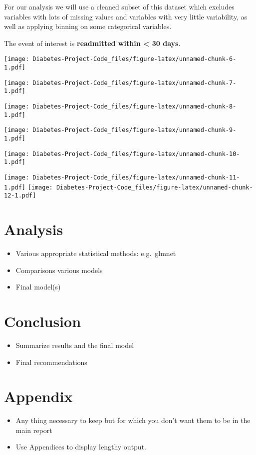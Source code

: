 \documentclass[
]{article}
\providecommand{\tightlist}{%
  \setlength{\itemsep}{0pt}\setlength{\parskip}{0pt}}
\begin{document}
For our analysis we will use a cleaned subset of this dataset which
excludes variables with lots of missing values and variables with very
little variability, as well as applying binning on some categorical
variables.

The event of interest is \textbf{readmitted within \textless{} 30 days}.

\texttt{[image: Diabetes-Project-Code\_files/figure-latex/unnamed-chunk-6-1.pdf]}

\texttt{[image: Diabetes-Project-Code\_files/figure-latex/unnamed-chunk-7-1.pdf]}

\texttt{[image: Diabetes-Project-Code\_files/figure-latex/unnamed-chunk-8-1.pdf]}

\texttt{[image: Diabetes-Project-Code\_files/figure-latex/unnamed-chunk-9-1.pdf]}

\texttt{[image: Diabetes-Project-Code\_files/figure-latex/unnamed-chunk-10-1.pdf]}

\texttt{[image: Diabetes-Project-Code\_files/figure-latex/unnamed-chunk-11-1.pdf]}
\texttt{[image: Diabetes-Project-Code\_files/figure-latex/unnamed-chunk-12-1.pdf]}

\hypertarget{analysis}{%
\section{Analysis}\label{analysis}}

\begin{itemize}
\tightlist
\item
  Various appropriate statistical methods: e.g.~glmnet
\item
  Comparisons various models
\item
  Final model(s)
\end{itemize}

\hypertarget{conclusion}{%
\section{Conclusion}\label{conclusion}}

\begin{itemize}
\tightlist
\item
  Summarize results and the final model
\item
  Final recommendations
\end{itemize}

\hypertarget{appendix}{%
\section{Appendix}\label{appendix}}

\begin{itemize}
\tightlist
\item
  Any thing necessary to keep but for which you don't want them to be in
  the main report
\item
  Use Appendices to display lengthy output.
\end{itemize}
\end{document}

